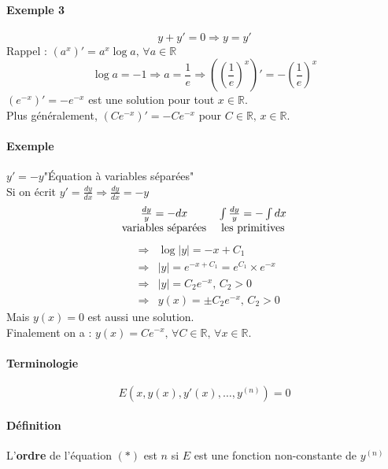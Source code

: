 \message{ !name(analyse-02.tex)}\documentclass[1Opt]{report}
\begin{document}
\paragraph{Exemple 3}
\[y+y'=0\Rightarrow y=y'\]
Rappel : $(a^x)'=a^x\log{a}, \, \forall a\in{\mathbb R}$
\[\log{a}=-1\Rightarrow a=\frac{1}{e}\Rightarrow \left(\left(\frac{1}{e}\right)^x\right)'=-\left(\frac{1}{e}\right)^x\]
$(e^{-x})'=-e^{-x}$ est une solution pour tout $x\in{\mathbb R}$.\\
Plus généralement, $(Ce^{-x})'=-Ce^{-x}$ pour $C\in{\mathbb R},\,x\in{\mathbb R}$.

\paragraph{Exemple}
$y'=-y$\quad "Équation à variables séparées" \\
Si on écrit $y'=\frac{dy}{dx}\Rightarrow\frac{dy}{dx}=-y$
\begin{eqnarray*}
  \begin{tabular}{c c}
    $\frac{dy}{y}=-dx$ & $\int{\frac{dy}{y}}=-\int{dx}$ \\
    variables séparées & les primitives
  \end{tabular}
\end{eqnarray*}
\begin{eqnarray*}
  & \Rightarrow & \log{|y|}=-x+C_1 \\
  & \Rightarrow & |y|=e^{-x+C_1}=e^{C_1}\times e^{-x}\\
  & \Rightarrow & |y|=C_2e^{-x},\, C_2>0\\
  & \Rightarrow & y(x)=\pm C_2e^{-x},\, C_2>0
\end{eqnarray*}
Mais $y(x)=0$ est aussi une solution.\\
Finalement on a : $y(x)=Ce^{-x},\,\forall C\in{\mathbb R},\,\forall x\in{\mathbb R}$.

\paragraph{Terminologie}
\begin{equation*}
  E\left(x,y(x),y'(x),\ldots,y^{(n)}\right)=0 \tag{$\ast$}
\end{equation*}

\paragraph{Définition}
L'\textbf{ordre} de l'équation $(\ast)$ est $n$ si $E$ est une fonction non-constante
de $y^{(n)}$
\end{document}

